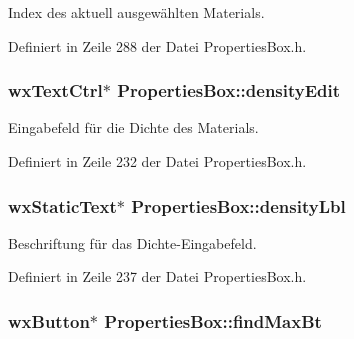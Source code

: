 Index des aktuell ausgewählten Materials. 



Definiert in Zeile 288 der Datei Properties\-Box.\-h.

\hypertarget{classPropertiesBox_a0c71f6f0ea002a57ac0750e8ae9cdf13}{
\subsubsection[{density\-Edit}]{\setlength{\rightskip}{0pt plus 5cm}wx\-Text\-Ctrl$\ast$ Properties\-Box\-::density\-Edit\hspace{0.3cm}{\ttfamily [private]}}}\label{classPropertiesBox_a0c71f6f0ea002a57ac0750e8ae9cdf13}


Eingabefeld für die Dichte des Materials. 



Definiert in Zeile 232 der Datei Properties\-Box.\-h.

\hypertarget{classPropertiesBox_a1c670a16a13cb03338867a35508f7f5a}{
\subsubsection[{density\-Lbl}]{\setlength{\rightskip}{0pt plus 5cm}wx\-Static\-Text$\ast$ Properties\-Box\-::density\-Lbl\hspace{0.3cm}{\ttfamily [private]}}}\label{classPropertiesBox_a1c670a16a13cb03338867a35508f7f5a}


Beschriftung für das Dichte-\/\-Eingabefeld. 



Definiert in Zeile 237 der Datei Properties\-Box.\-h.

\hypertarget{classPropertiesBox_af03e4a7248c0cb91f3978eadc0936c61}{
\subsubsection[{find\-Max\-Bt}]{\setlength{\rightskip}{0pt plus 5cm}wx\-Button$\ast$ Properties\-Box\-::find\-Max\-Bt\hspace{0.3cm}{\ttfamily [private]}}}\label{classPropertiesBox_af03e4a7248c0cb91f3978eadc0936c61}


